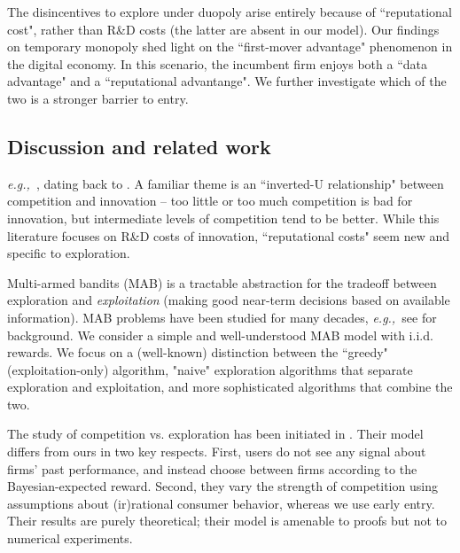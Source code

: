 \documentclass[letterpaper]{article}
\theoremstyle{definition}
\newcommand{\eg}{{\em e.g.,~\xspace}}
\begin{document}
The disincentives to explore under duopoly arise entirely because of ``reputational cost", rather than R\&D costs (the latter are absent in our model). Our findings on temporary monopoly shed light on the ``first-mover advantage" phenomenon in the digital economy. In this scenario, the incumbent firm enjoys both a ``data advantage" and a ``reputational advantange". We further investigate which of the two is a stronger barrier to entry. 



\subsection{Discussion and related work} 
 \eg \cite{barro2004economic,aghion2005competition}, dating back to \cite{schumpeter2010capitalism}. A familiar theme is an ``inverted-U relationship" between competition and innovation -- too little or too much competition is bad for innovation, but intermediate levels of competition tend to be better. While this literature focuses on R\&D costs of innovation, ``reputational costs" seem new and specific to exploration.

Multi-armed bandits (MAB) is a tractable abstraction for the tradeoff between exploration and \emph{exploitation} (making good near-term decisions based on available information). MAB problems have been studied for many decades, \eg see \cite{Bubeck-survey12} for background. We consider a simple and well-understood MAB model with i.i.d. rewards. We focus on a (well-known) distinction between the ``greedy" (exploitation-only) algorithm, "naive" exploration algorithms that separate exploration and exploitation, and more sophisticated algorithms that combine the two.

The study of competition vs. exploration has been initiated in \cite{CompetingBandits-itcs16}. Their model differs from ours in two key respects. First, users do not see any signal about firms' past performance, and instead choose between firms according to the Bayesian-expected reward. Second, they vary the strength of competition using assumptions about (ir)rational consumer behavior, whereas we use early entry. Their results are purely theoretical; their model is amenable to proofs but not to numerical experiments.
\end{document}
